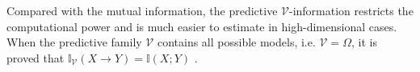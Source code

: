 Compared with the mutual information, the predictive $\mathcal V$-information restricts the computational power and is much easier to estimate in high-dimensional cases.
When the predictive family $\mathcal V$ contains all possible models, i.e. $\mathcal V = \Omega$, it is proved that $\mathbb{I}_{\mathcal V}(X\rightarrow Y)=\mathbb{I}(X;Y)$ \citep{DBLP:conf/iclr/XuZSSE20}.


























